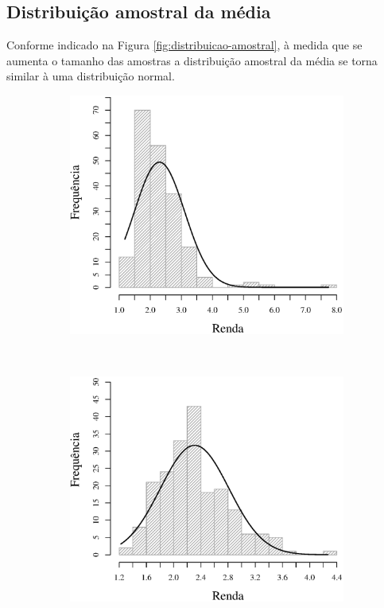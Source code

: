 \subsection{Distribuição amostral da média}
Conforme indicado na Figura \ref{fig:distribuicao-amostral}, à medida que se aumenta o tamanho das amostras
a distribuição amostral da média se torna similar à uma distribuição normal.

\begin{figure}
	\centering
	\begin{subfigure}[b]{0.48\textwidth}
		\includegraphics[width=\textwidth]{plots/histogram_renda_n4.eps}
		\caption{}
		\label{fig:m4}
	\end{subfigure}
	~
	\begin{subfigure}[b]{0.48\textwidth}
		\includegraphics[width=\textwidth]{plots/histogram_renda_n8.eps}

\end{subfigure}
\end{figure}
